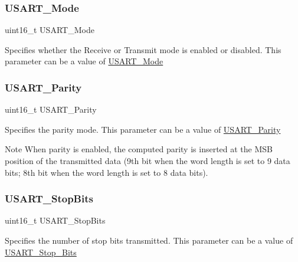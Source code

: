 \subsubsection{\texorpdfstring{U\+S\+A\+R\+T\+\_\+\+Mode}{USART\_Mode}}
{\footnotesize\ttfamily uint16\+\_\+t U\+S\+A\+R\+T\+\_\+\+Mode}

Specifies whether the Receive or Transmit mode is enabled or disabled. This parameter can be a value of \mbox{\hyperlink{group___u_s_a_r_t___mode}{U\+S\+A\+R\+T\+\_\+\+Mode}} \mbox{\label{struct_u_s_a_r_t___init_type_def_a4edcc84644c8553a1a6e841c48ea8413}} 
\subsubsection{\texorpdfstring{U\+S\+A\+R\+T\+\_\+\+Parity}{USART\_Parity}}
{\footnotesize\ttfamily uint16\+\_\+t U\+S\+A\+R\+T\+\_\+\+Parity}

Specifies the parity mode. This parameter can be a value of \mbox{\hyperlink{group___u_s_a_r_t___parity}{U\+S\+A\+R\+T\+\_\+\+Parity}} \begin{DoxyNote}{Note}
When parity is enabled, the computed parity is inserted at the M\+SB position of the transmitted data (9th bit when the word length is set to 9 data bits; 8th bit when the word length is set to 8 data bits). 
\end{DoxyNote}
\mbox{\label{struct_u_s_a_r_t___init_type_def_aa58409990a6a0bc99f432eb90e204c0f}} 
\subsubsection{\texorpdfstring{U\+S\+A\+R\+T\+\_\+\+Stop\+Bits}{USART\_StopBits}}
{\footnotesize\ttfamily uint16\+\_\+t U\+S\+A\+R\+T\+\_\+\+Stop\+Bits}

Specifies the number of stop bits transmitted. This parameter can be a value of \mbox{\hyperlink{group___u_s_a_r_t___stop___bits}{U\+S\+A\+R\+T\+\_\+\+Stop\+\_\+\+Bits}} \mbox{\label{struct_u_s_a_r_t___init_type_def_aa1248b67914e095c0de768223eea9328}} 
